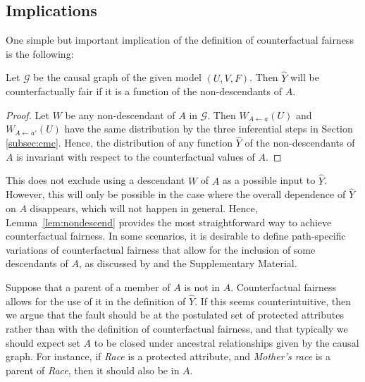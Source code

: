 

\subsection{Implications}
%
One simple but important implication of the definition of counterfactual fairness is the following:
%
\begin{lem}
  \label{lem:nondescend}
  Let $\mathcal G$ be the causal graph of the given model $(U, V, F)$.
  Then $\hat Y$ will be counterfactually fair if it is a function
  of the non-descendants of $A$.
\end{lem}
%
\begin{proof}
 Let $W$ be any non-descendant of $A$ in $\mathcal G$. Then $W_{A
   \leftarrow a}(U)$ and $W_{A \leftarrow a'}(U)$ have the same
 distribution by the three inferential steps in Section
 \ref{subsec:cmc}.  Hence, the distribution of any function $\hat Y$ of the non-descendants of $A$
 is invariant with respect to the counterfactual values of $A$.
\end{proof}

This does not exclude using a descendant $W$ of $A$ as a possible
input to $\hat Y$. However, this will only be possible in the case
where the overall dependence of $\hat Y$ on $A$ disappears, which will
not happen in general. Hence, Lemma~\ref{lem:nondescend} provides the
most straightforward way to achieve counterfactual fairness. In some
scenarios, it is desirable to define path-specific variations of
counterfactual fairness that allow for the inclusion of some descendants
of $A$, as discussed by \cite{nabi:17,kilbertus:17} and the
Supplementary Material.

 Suppose that
a parent of a member of $A$ is not in $A$.  Counterfactual fairness
allows for the use of it in the definition of $\hat Y$. If this seems
counterintuitive, then we argue that the fault should be at the
postulated set of protected attributes rather than with the definition
of counterfactual fairness, and that typically we should expect set
$A$ to be closed under ancestral relationships given by the causal
graph. For instance, if {\it Race} is a protected attribute, and {\it
  Mother's race} is a parent of {\it Race}, then it should also be in
$A$.

